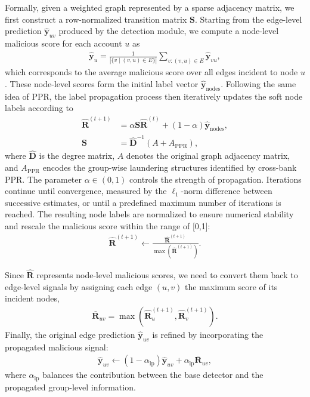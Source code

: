 \documentclass[11pt,english]{article}
\renewcommand{\hat}{\widehat}
\begin{document}
Formally, given a weighted graph represented by a sparse adjacency matrix, we first construct a row-normalized transition matrix $\mathbf{S}$. Starting from the edge-level prediction $\hat{\mathbf{y}}_{uv}$ produced by the detection module, we compute a node-level malicious score for each account $u$ as
\begin{align}
    \hat{\mathbf{y}}_u = \frac{1}{|\{v \mid (v,u)\in E\}|} \sum_{v:(v,u)\in E} \hat{\mathbf{y}}_{vu},
\end{align}
which corresponds to the average malicious score over all edges incident to node $u$. These node-level scores form the initial label vector $\hat{\mathbf{y}}_{\text{nodes}}$.
Following the same idea of PPR, the label propagation process then iteratively updates the soft node labels according to
\begin{align}
    \mathbf{\hat{R}}^{(t+1)} &= \alpha \mathbf{S}\mathbf{\hat{R}}^{(t)} + (1-\alpha)\hat{\mathbf{y}}_{\text{nodes}}, \\
    \nonumber \mathbf{S} &= \mathbf{\hat{D}}^{-1}(A + A_{\text{PPR}}),
\end{align}
where $\mathbf{\hat{D}}$ is the degree matrix, $A$ denotes the original graph adjacency matrix, and $A_{\text{PPR}}$ encodes the group-wise laundering structures identified by cross-bank PPR. The parameter $\alpha \in (0,1)$ controls the strength of propagation. Iterations continue until convergence, measured by the $\ell_1$-norm difference between successive estimates, or until a predefined maximum number of iterations is reached. The resulting node labels are normalized to ensure numerical stability and rescale the malicious score within the range of [0,1]:
\begin{align}
    \mathbf{\hat{R}}^{(t+1)} \leftarrow \frac{\mathbf{\hat{R}}^{(t+1)}}{\max(\mathbf{\hat{R}}^{(t+1)})}.
\end{align}

Since $\mathbf{\hat{R}}$ represents node-level malicious scores, we need to convert them back to edge-level signals by assigning each edge $(u,v)$ the maximum score of its incident nodes,
\begin{align}
    \mathbf{\bar{R}}_{uv} = \max\left(\mathbf{\hat{R}}^{(t+1)}_u, \mathbf{\hat{R}}^{(t+1)}_v\right).
\end{align}
Finally, the original edge prediction $\hat{\mathbf{y}}_{uv}$ is refined by incorporating the propagated malicious signal:
\begin{align}
    \hat{\mathbf{y}}_{uv} \leftarrow (1-\alpha_{\text{lp}})\hat{\mathbf{y}}_{uv} + \alpha_{\text{lp}}\mathbf{\bar{R}}_{uv},
\end{align}
where $\alpha_{\text{lp}}$ balances the contribution between the base detector and the propagated group-level information.
\end{document}
